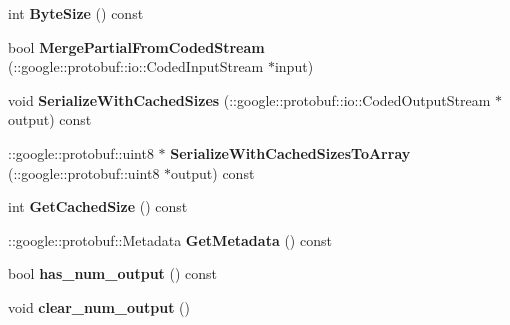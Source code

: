 \begin{DoxyCompactItemize}
\item 
\mbox{\label{classcaffe_1_1_inner_product_parameter_a8560b9697ec4114511f7e4db2d3c6ca9}} 
int {\bfseries Byte\+Size} () const
\item 
\mbox{\label{classcaffe_1_1_inner_product_parameter_afad5b54b1115364042aa6a7daa2ca514}} 
bool {\bfseries Merge\+Partial\+From\+Coded\+Stream} (\+::google\+::protobuf\+::io\+::\+Coded\+Input\+Stream $\ast$input)
\item 
\mbox{\label{classcaffe_1_1_inner_product_parameter_a802b3e4bd086b702d14e7fb6fdc1471e}} 
void {\bfseries Serialize\+With\+Cached\+Sizes} (\+::google\+::protobuf\+::io\+::\+Coded\+Output\+Stream $\ast$output) const
\item 
\mbox{\label{classcaffe_1_1_inner_product_parameter_a97d286c91622898df621962616041c29}} 
\+::google\+::protobuf\+::uint8 $\ast$ {\bfseries Serialize\+With\+Cached\+Sizes\+To\+Array} (\+::google\+::protobuf\+::uint8 $\ast$output) const
\item 
\mbox{\label{classcaffe_1_1_inner_product_parameter_a1ba5b4b06764dff77417c04089a1eef0}} 
int {\bfseries Get\+Cached\+Size} () const
\item 
\mbox{\label{classcaffe_1_1_inner_product_parameter_afc9274e39db0aa24f27eb308b5e72ad7}} 
\+::google\+::protobuf\+::\+Metadata {\bfseries Get\+Metadata} () const
\item 
\mbox{\label{classcaffe_1_1_inner_product_parameter_a9002899c49e5572587f301eff1c1c5e0}} 
bool {\bfseries has\+\_\+num\+\_\+output} () const
\item 
\mbox{\label{classcaffe_1_1_inner_product_parameter_a4c291e7248e6da7ae556245b7d561440}} 
void {\bfseries clear\+\_\+num\+\_\+output} ()
\item 
\mbox{\label{classcaffe_1_1_inner_product_parameter_a831f80e0fa0897c05f2c309a8283d92d}} 

\end{DoxyCompactItemize}
